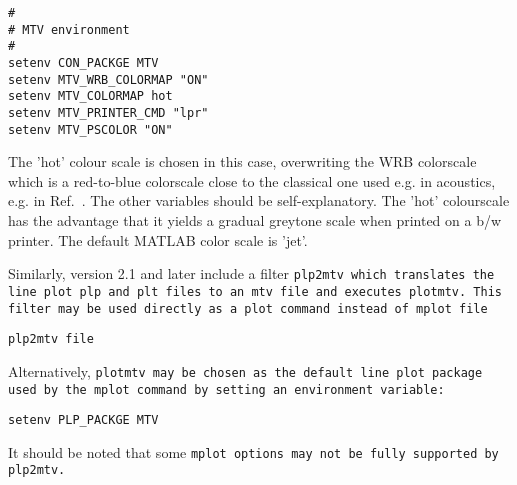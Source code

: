\begin{verbatim}
#
# MTV environment
#
setenv CON_PACKGE MTV
setenv MTV_WRB_COLORMAP "ON"
setenv MTV_COLORMAP hot
setenv MTV_PRINTER_CMD "lpr"
setenv MTV_PSCOLOR "ON"
\end{verbatim}

The 'hot' colour scale is chosen in this case, overwriting the WRB
colorscale which is a red-to-blue colorscale close to the classical
one used e.g. in acoustics, e.g. in Ref.~\cite{jkps}. The other
variables should be self-explanatory. The 'hot' colourscale has the
advantage that it yields a gradual greytone scale when printed on a
b/w printer. The default MATLAB color scale is 'jet'.

Similarly, version 2.1 and later include a filter \tt plp2mtv \rm
which translates the line plot \tt plp \rm and \tt plt \rm files to an \tt mtv
\rm file and executes \tt plotmtv. \rm This filter may be used
directly as a plot command instead of \tt mplot file \rm

\begin{verbatim}
plp2mtv file
\end{verbatim}

Alternatively, \tt plotmtv \rm may be chosen as the default line plot
package used by the \tt mplot \rm command by setting an environment
variable:

\begin{verbatim}
setenv PLP_PACKGE MTV
\end{verbatim}

It should be noted that some \tt mplot \rm options may not be fully
supported by \tt plp2mtv. \rm








